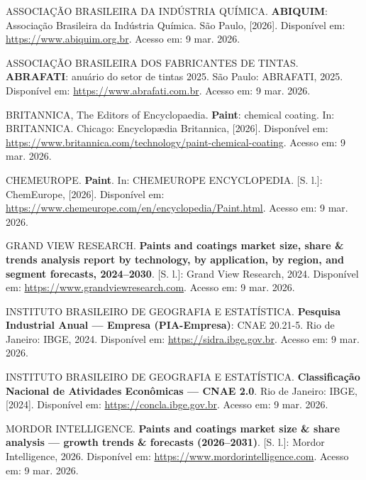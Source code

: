 \documentclass[
  12pt,
  a4paper,
  oneside,
  brazil,
  chapter=TITLE
]{article}
\begin{document}
ASSOCIAÇÃO BRASILEIRA DA INDÚSTRIA QUÍMICA. \textbf{ABIQUIM}: Associação
Brasileira da Indústria Química. São Paulo, {[}2026{]}. Disponível em:
\url{https://www.abiquim.org.br}. Acesso em: 9 mar. 2026.

ASSOCIAÇÃO BRASILEIRA DOS FABRICANTES DE TINTAS. \textbf{ABRAFATI}:
anuário do setor de tintas 2025. São Paulo: ABRAFATI, 2025. Disponível
em: \url{https://www.abrafati.com.br}. Acesso em: 9 mar. 2026.

BRITANNICA, The Editors of Encyclopaedia. \textbf{Paint}: chemical
coating. In: BRITANNICA. Chicago: Encyclopædia Britannica, {[}2026{]}.
Disponível em:
\url{https://www.britannica.com/technology/paint-chemical-coating}. Acesso em:
9 mar. 2026.

CHEMEUROPE. \textbf{Paint}. In: CHEMEUROPE ENCYCLOPEDIA. {[}S. l.{]}:
ChemEurope, {[}2026{]}. Disponível em:
\url{https://www.chemeurope.com/en/encyclopedia/Paint.html}. Acesso em: 9 mar.
2026.

GRAND VIEW RESEARCH. \textbf{Paints and coatings market size, share \&
trends analysis report by technology, by application, by region, and
segment forecasts, 2024--2030}. {[}S. l.{]}: Grand View Research, 2024.
Disponível em: \url{https://www.grandviewresearch.com}. Acesso em: 9 mar.
2026.

INSTITUTO BRASILEIRO DE GEOGRAFIA E ESTATÍSTICA. \textbf{Pesquisa
Industrial Anual --- Empresa (PIA-Empresa)}: CNAE 20.21-5. Rio de
Janeiro: IBGE, 2024. Disponível em: \url{https://sidra.ibge.gov.br}. Acesso
em: 9 mar. 2026.

INSTITUTO BRASILEIRO DE GEOGRAFIA E ESTATÍSTICA. \textbf{Classificação
Nacional de Atividades Econômicas --- CNAE 2.0}. Rio de Janeiro: IBGE,
{[}2024{]}. Disponível em: \url{https://concla.ibge.gov.br}. Acesso em: 9 mar.
2026.

MORDOR INTELLIGENCE. \textbf{Paints and coatings market size \& share
analysis --- growth trends \& forecasts (2026--2031)}. {[}S. l.{]}:
Mordor Intelligence, 2026. Disponível em:
\url{https://www.mordorintelligence.com}. Acesso em: 9 mar. 2026.

\end{document}
